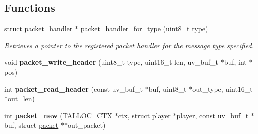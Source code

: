 \subsection*{Functions}
\begin{DoxyCompactItemize}
\item 
struct \hyperlink{structpacket__handler}{packet\+\_\+handler} $\ast$ \hyperlink{group__packet_gae1a0e160a43c079e2d7962f47f58bf58}{packet\+\_\+handler\+\_\+for\+\_\+type} (uint8\+\_\+t type)
\begin{DoxyCompactList}\small\item\em Retrieves a pointer to the registered packet handler for the message type specified. \end{DoxyCompactList}\item 
\hypertarget{group__packet_gac1eeb3e87dd58880b8845a81d790511a}{}void {\bfseries packet\+\_\+write\+\_\+header} (uint8\+\_\+t type, uint16\+\_\+t len, uv\+\_\+buf\+\_\+t $\ast$buf, int $\ast$pos)\label{group__packet_gac1eeb3e87dd58880b8845a81d790511a}

\item 
\hypertarget{group__packet_ga369495736b1aa87c1a27a60fc9501d90}{}int {\bfseries packet\+\_\+read\+\_\+header} (const uv\+\_\+buf\+\_\+t $\ast$buf, uint8\+\_\+t $\ast$out\+\_\+type, uint16\+\_\+t $\ast$out\+\_\+len)\label{group__packet_ga369495736b1aa87c1a27a60fc9501d90}

\item 
\hypertarget{group__packet_gae618365b8e6293ce17a773149a384fcf}{}int {\bfseries packet\+\_\+new} (\hyperlink{group__talloc_ga8a521b1347c0e37b84eb942db8fa9beb}{T\+A\+L\+L\+O\+C\+\_\+\+C\+T\+X} $\ast$ctx, struct \hyperlink{structplayer}{player} $\ast$\hyperlink{structplayer}{player}, const uv\+\_\+buf\+\_\+t $\ast$buf, struct \hyperlink{structpacket}{packet} $\ast$$\ast$out\+\_\+packet)\label{group__packet_gae618365b8e6293ce17a773149a384fcf}

\end{DoxyCompactItemize}
